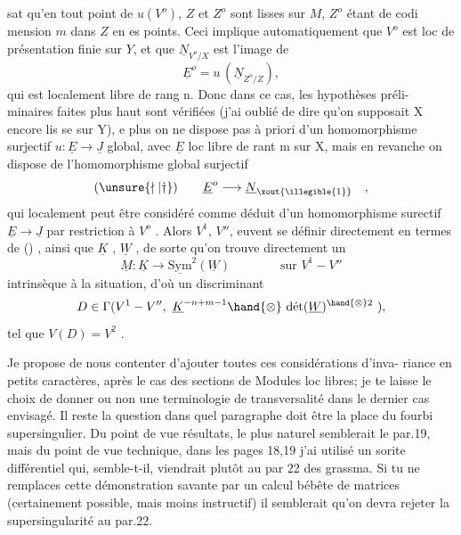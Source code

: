
sat qu'en tout point de $u(V^{o})$, $Z$ et $Z^{o}$ sont lisses sur $M$, $Z^{o}$ étant de codi
mension $m$ dans $Z$ en es points. Ceci implique automatiquement que $V^{o}$ est
loc de présentation finie sur $Y$, et que $\underline{N}_{V^{o}/X}$ est l'image de
\[ \underline{E}^{o} = u\,(\underline{N}_{Z^{o}/Z}) , \]
qui est localement libre de rang n. Donc dans ce cas, les hypothèses préli-%
minaires faites plus haut sont vérifiées (j'ai oublié de dire qu'on supposait
X encore lis se sur Y), e plus on ne dispose pas\inserted{\unsure{,}} à priori d'un homomorphisme
surjectif $u:\underline{E}\rightarrow\underline{J}$ global, avec $\underline{E}$ loc libre de rant m sur X, mais en revanche
on dispose de l'homomorphisme global surjectif
\[ (\unsure{\nmid|\dagger}) \qquad \underline{E}^{o}\longrightarrow \underline{N}_{\xout{\illegible{1}}} \quad , \]
qui localement peut être considéré comme déduit d'un homomorphisme surectif
$\underline{E}\rightarrow\underline{J}$ par restriction à $V^{o}$ . Alors $V^{1}$, $V''$, euvent se définir directement
en termes de (\unsure{$\nmid$|$\dagger$}) , ainsi que $\underline{K}$ , $\underline{W}$ , de sorte qu'on trouve directement un
\[ \underline{M} : \underline{K}\rightarrow \underline{\mathrm{Sym}}^{2}(\underline{W}) \qquad\qquad \text{sur } V^{1}-V'' \]
intrinsèque à la situation, d'où  un discriminant
\[ D \in \Gamma(V^{1}-V'',\ \underline{K}^{-n+m-1}\hand{\otimes}\ \text{dét}(\underline{W})^{\hand{\otimes}2}\ ), \]
tel que $V(D) = V^{2}$ .

Je propose de nous contenter d'ajouter toutes ces considérations d'inva-%
riance en petits caractères, après le cas des sections de Modules loc libres;
je te laisse le choix de donner ou non une terminologie de transversalité dans
le dernier cas envisagé. Il reste la question dans quel paragraphe doit être
la place du fourbi supersingulier. Du point de vue résultats, le plus naturel
semblerait le par.19, mais du point de vue technique, dans les pages 18,19
j'ai utilisé un sorite différentiel qui, semble-t-il, viendrait plutôt au par
22 des grassma. Si tu ne remplaces cette démonstration savante par un
calcul bébête de matrices (certainement possible, mais moins instructif) il
semblerait qu'on devra rejeter la supersingularité au par.22.

